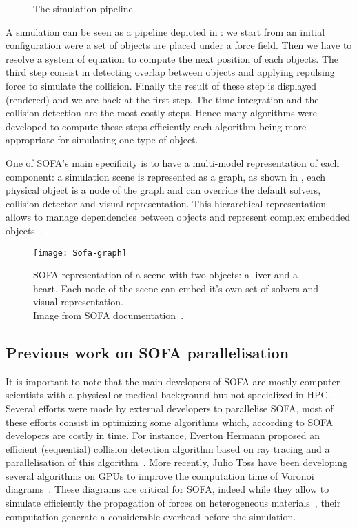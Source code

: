 \begin{figure}[htb]
    \centering
    
    \caption[The simulation pipeline]{The simulation pipeline}
    \label{fig:simu-pipeline}
\end{figure}


A simulation can be seen as a pipeline depicted in : we start from an initial configuration were a set of objects are placed under a force field.
Then we have to resolve a system of equation to compute the next position of each objects.
The third step consist in detecting overlap between objects and applying repulsing force to simulate the collision.
 Finally the result of these step is displayed (rendered) and we are back at the first step.
The time integration and the collision detection are the most costly steps.
Hence many algorithms  were developed to compute these steps efficiently each algorithm being more appropriate for simulating one type of object.

One of \gls{SOFA}'s main specificity is to have a multi-model representation of each component: a simulation scene is represented as a graph, as shown in , each physical object is a node of the graph and can override the default solvers, collision detector and visual representation.
This hierarchical representation allows to manage dependencies between objects and represent complex embedded objects~\cite{Nesme09Preserving,Faure11Sparse}.

\begin{figure}[htb]
    \centering
    \texttt{[image: Sofa-graph]}
    \caption[Example of SOFA scene graph]{SOFA representation of a scene with two objects: a liver and a
        heart. Each node of the scene can embed it's own set of solvers and
        visual representation.\\
        Image from SOFA documentation~\cite{SOFA16Sofa}.}
    \label{fig:sofa-tree}
\end{figure}

\subsection{Previous work on SOFA parallelisation}

It is important to note that the main developers of \gls{SOFA} are  mostly computer scientists with a physical or medical background but not specialized in \gls{HPC}.
Several efforts were made by external developers to parallelise \gls{SOFA}, most of these efforts consist in optimizing some algorithms which, according to \gls{SOFA} developers are costly in time.
For instance, Everton Hermann proposed an efficient (sequential) collision detection algorithm based on ray tracing and a parallelisation of this algorithm~\cite{Hermann08Raytraced}.
More recently, Julio Toss have been developing several algorithms on \glspl{GPU} to improve the computation time of Voronoi diagrams~\cite{Toss13Parallel,Toss14Parallel}.
These diagrams are critical for \gls{SOFA}, indeed while they allow to simulate efficiently the propagation of forces on heterogeneous materials~\cite{Faure11Sparse}, their computation generate a considerable overhead before the simulation.

